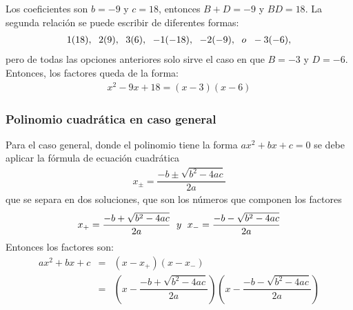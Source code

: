 Los coeficientes son $b=-9$ y $c=18$, entonces $B+D=-9$ y $BD=18$. La segunda relación se puede escribir de diferentes formas:
\begin{eqnarray*}
1(18),\hspace{6px}2(9),\hspace{6px}3(6),\hspace{6px}-1(-18),\hspace{6px}-2(-9),\hspace{6px}o \hspace{6px}-3(-6),
\end{eqnarray*}
pero de todas las opciones anteriores solo sirve el caso en que  $B=-3$ y $D=-6$. Entonces, los factores queda de la forma:
\begin{eqnarray*}
x^{2}-9x+18=(x-3)(x-6)
\end{eqnarray*}

\subsubsection{Polinomio cuadrática en caso general}
Para el caso general, donde el polinomio tiene la forma $ax^{2}+bx+c=0$ se debe aplicar la fórmula de ecuación cuadrática
\begin{eqnarray}
x_{\pm}=\dfrac{-b\pm\sqrt{b^{2}-4ac}}{2a}
\label{ecccuadra}
\end{eqnarray}
que se separa en dos soluciones, que son los números que componen los factores 
\begin{eqnarray}
x_{+}=\dfrac{-b+\sqrt{b^{2}-4ac}}{2a} \hspace{6px}y\hspace{6px}x_{-}=\dfrac{-b-\sqrt{b^{2}-4ac}}{2a}
\end{eqnarray}
Entonces los factores son:
\begin{eqnarray}
ax^{2}+bx+c&=&( x-x_{+})(x-x_{-})\\
&=&\left( x-\dfrac{-b+\sqrt{b^{2}-4ac}}{2a} \right) \left( x-\dfrac{-b-\sqrt{b^{2}-4ac}}{2a}\right)
\end{eqnarray}

